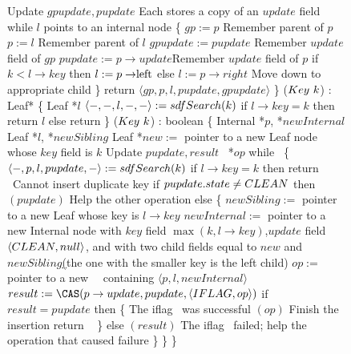 \begin{figure*}
\begin{code}
       Update $gpupdate, pupdate$ \tabtabcom Each stores a copy of an $update$ field\bl\nl
       while $l$ points to an internal node \{ \nl%
\n         $gp := p$ \tabtabcom Remember parent of $p$\nl
           $p := l$ \tabtabcom Remember parent of $l$\nl
           $gpupdate := pupdate$ \tabtabcom Remember $update$ field of $gp$\nl
           $pupdate := p\rightarrow update$\label{store-pupdate}\tabtabcom Remember $update$ field of $p$\nl  
           if $k < l\rightarrow key$ then $l:= p\rightarrow \lft$ else $l:=p \rightarrow right$ \label{read-child}\tabtabcom Move down to appropriate child\nl
       \p \} \nl
       return $\langle gp, p, l, pupdate, gpupdate \rangle$ \nl
\p 
\}\bl
\nl
{}($Key\ k$) : Leaf* \{ \nl
\n   Leaf *$l$\bl
\nl
     $\langle -,-,l,-,-\rangle := sdf{Search}(k)$\nl
     if $l\rightarrow key = k$ then return $l$\nl
     else return \NULL\nl
\p
\}\bl
\nl
{}($Key\ k$) : boolean \{ \nl
\n Internal *$p$, *$newInternal$\nl 
   Leaf *$l$, *$newSibling$\nl 
   Leaf *$new :=$ pointer to a new Leaf node whose $key$ field is $k$  \nl
   Update $pupdate, result$\nl
   \IFlag\ *$op$\bl\nl%
   while \TRUE\ \{  \nl
   \n $\langle -, p, l, pupdate, - \rangle := sdf{Search}(k)$ \label{ins-search}\nl
      if $l \rightarrow key = k$ then return \FALSE\ \tabtabcom Cannot insert duplicate key\label{insert-false}\nl
      if $pupdate.state \neq C\scriptsize LEAN \normalsize$ then $(pupdate)$ \tabtabcom Help the other operation \label{ins-help-unclean}\nl
      else \{\nl
\n        $newSibling :=$ pointer to a new Leaf whose key is $l\rightarrow key$\nl
          $newInternal :=$ pointer to a new Internal node with $key$ field $\max(k, l \rightarrow key)$,\label{create-internal}\ul      
    \n      $update$ field $\langle C\scriptsize LEAN \normalsize, null\rangle$, and with two
       	  child fields equal to $new$ and $newSibling$\ul 
	         (the one with the smaller key is the left child)\nl
\p        $op :=$ pointer to a new \IFlag\ \record\  containing $\langle p, l, newInternal\rangle$\label{new-IFlag}\nl
          $result := \CAS(p\rightarrow update, pupdate, \langle \insertflag, op\rangle)$ \label{iflag-cas} \nl
          if $result = pupdate$ then \{ \tabtabcom The iflag \CAS\ was successful\nl
\n            {}$(op)$ \tabtabcom Finish the insertion\label{finish-insert}\nl
              return \TRUE\ \label{insert-true}\nl
\p        \}\nl 
          else $(result)$ \tabcom The iflag \CAS\ failed; help the operation that caused failure\label{ins-help-after-failure}\nl
\p    \}\nl
\p\}\nl 
\p
\}\bl
\nl


\end{code}
\end{figure*}
